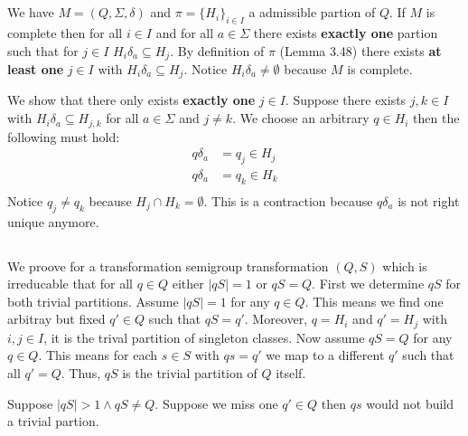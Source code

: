 \documentclass[a4paper,12pt,numbers=noenddot]{scrreport}
\begin{document}

\setcounter{chapter}{4}
\chapter{}
\section{}
We have $M = (Q, \Sigma, \delta)$ and $\pi = \{H_i\}_{i \in I}$ a admissible partion of $Q$.
If $M$ is complete then for all $i \in I$ and for all $a \in \Sigma$ there exists \textbf{exactly one} partion such that for $j \in I$ $H_i\delta_a \subseteq H_j$.
By definition of $\pi$ (Lemma 3.48) there exists \textbf{at least one} $j \in I$ with $H_i\delta_a \subseteq H_j$.
Notice $H_i\delta_a \neq \emptyset$ because $M$ is complete.

We show that there only exists \textbf{exactly one} $j \in I$.
Suppose there exists $j,k \in I$ with $H_i\delta_a \subseteq H_{j,k}$ for all $a \in \Sigma$ and $j \neq k$.
We choose an arbitrary $q \in H_i$ then the following must hold:
\begin{align*}
    q\delta_a &= q_j \in H_j \\
    q\delta_a &= q_k \in H_k \\
\end{align*}
Notice $q_j \neq q_k$ because $H_j \cap H_k = \emptyset$.
This is a contraction because $q\delta_a$ is not right unique anymore.

\section{}
We proove for a transformation semigroup transformation $(Q,S)$ which is irreducable that for all $q \in Q$ either $|qS| = 1$  or $qS = Q$.
First we determine $qS$ for both trivial partitions.
Assume $|qS| = 1$ for any $q \in Q$. This means we find one arbitray but fixed $q' \in Q$ such that $qS = q'$.
Moreover, $q = H_i$ and $q' = H_j$ with $i,j \in I$, it is the trival partition of singleton classes.
Now assume $qS = Q$ for any $q \in Q$. This means for each $s \in S$ with $qs = q'$ we map to a different $q'$ such that all $q' = Q$.
Thus, $qS$ is the trivial partition of $Q$ itself.


Suppose $|qS| > 1 \land qS \neq Q$.
Suppose we miss one $q' \in Q$ then $qs$ would not build a trivial partion.

\end{document}
